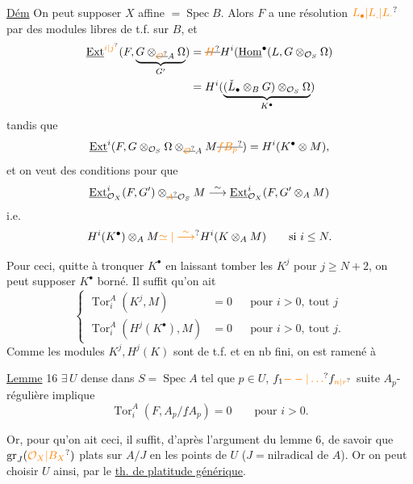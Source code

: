 \uline{Dém} On peut supposer $X$ affine $=\operatorname{Spec}B$. Alors $F$ a une résolution $\unsure{L_{\bullet}|L_{.}|L_{\cdot}}$ par des modules libres de t.f. sur $B$, et
\[
 \begin{aligned}
 \underline{\operatorname{Ext}}^{\unsure{i|j}}(F,\underbrace{G\otimes_{\deleted{\unsure{\mathcal O}}A}\Omega}_{G'})
 &=\deleted{\unsure{H}}H^i(\underline{\operatorname{Hom}}^\bullet(L,G\otimes_{\mathcal O_S}\Omega)\\
 &= H^i(\underbrace{(\check{L}_{\bullet}\otimes_B G)\otimes_{\mathcal O_S}\Omega}_{K^\bullet})
 \end{aligned}
\]
tandis que
\[
 \underline{\operatorname{Ext}}^i(F,G\otimes_{\mathcal O_S}\Omega\otimes_{\deleted{\unsure{\mathcal O}}A}M\deleted{\unsure{fB_p}})=H^i(K^\bullet\otimes M),
\]
et on veut des conditions pour que
\[
 \underline{\operatorname{Ext}}^i_{\mathcal O_X}(F,G')\otimes_{\deleted{\unsure{A}}\mathcal O_S}M
 \overset{\sim}{\longrightarrow}\underline{\operatorname{Ext}}^i_{\mathcal O_X}(F,G'\otimes_A M)
\]
i.e.
\[
 H^i(K^\bullet)\otimes_A M\unsure{\simeq|\overset{\sim}{\longrightarrow}} H^i(K\otimes_A M)\qquad\text{si }i\leq N.
\]

Pour ceci, quitte à tronquer $K^\bullet$ en laissant tomber les $K^j$ pour $j\geq N+2$, on peut supposer $K^\bullet$ borné. Il suffit qu'on ait
\[
 \left\{\begin{aligned}
 \operatorname{Tor}^A_i(K^j,M)&=0 &&\text{pour }i>0,\ \text{tout }j\\
 \operatorname{Tor}^A_i(H^j(K^\bullet),M)&=0 &&\text{pour }i>0,\ \text{tout }j.
 \end{aligned}\right.
\]
Comme les modules $K^j,H^j(K)$ sont de t.f. et en nb fini, on est ramené à  

\uline{Lemme} 16  $\exists\,U$ dense dans $S=\operatorname{Spec}A$ tel que $p\in U$, $f_1\unsure{--|\ldots} f_{\unsure{n|r}}$  suite $A_p$-régulière implique
\[
 \operatorname{Tor}^A_i(F,A_p/\underline f A_p)=0\qquad\text{pour }i>0.
\]

Or, pour qu'on ait ceci, il suffit, d'après l'argument  du lemme 6, de savoir que $\operatorname{gr}_J(\unsure{\mathcal O_X|B_X})$   plats sur $A/J$ en les points de $U$ ($J=\text{nilradical de } A$). Or on peut choisir $U$ ainsi, par le \uline{th. de platitude générique}.

